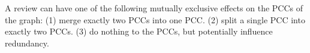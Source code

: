 \begin{appendices}
\begin{enumln}
\item A review can have one of the following mutually exclusive effects on the PCCs of the graph:
    (1) merge exactly two PCCs into one PCC.
    (2) split a single PCC into exactly two PCCs.
    (3) do nothing to the PCCs, but potentially influence redundancy.
\end{enumln}
  

\end{appendices}
